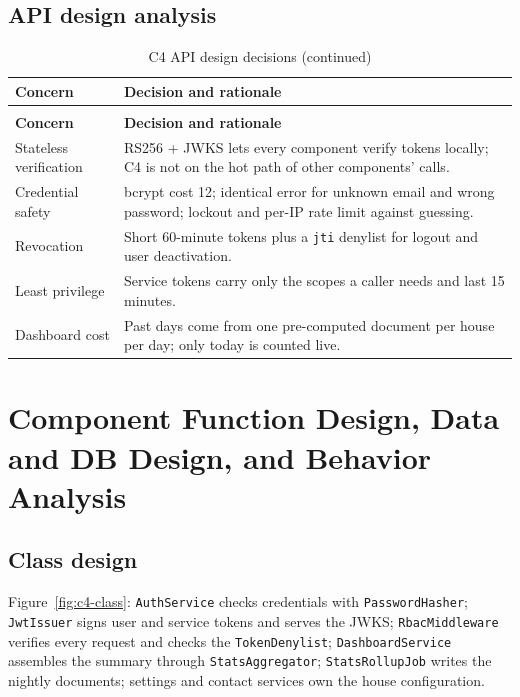 \subsection{API design analysis}
\begin{longtable}{L{2.8cm}L{12.0cm}}
\caption{C4 API design decisions}\\
\toprule
\textbf{Concern} & \textbf{Decision and rationale} \\
\midrule
\endfirsthead
\caption[]{C4 API design decisions (continued)}\\
\toprule
\textbf{Concern} & \textbf{Decision and rationale} \\
\midrule
\endhead
Stateless verification & RS256 + JWKS lets every component verify tokens locally; C4 is not on the hot path of other components' calls. \\
Credential safety & bcrypt cost 12; identical error for unknown email and wrong password; lockout and per-IP rate limit against guessing. \\
Revocation & Short 60-minute tokens plus a \texttt{jti} denylist for logout and user deactivation. \\
Least privilege & Service tokens carry only the scopes a caller needs and last 15 minutes. \\
Dashboard cost & Past days come from one pre-computed document per house per day; only today is counted live. \\
\bottomrule
\end{longtable}

\section{Component Function Design, Data and DB Design, and Behavior Analysis}

\subsection{Class design}
Figure~\ref{fig:c4-class}: \texttt{AuthService} checks credentials with \texttt{PasswordHasher}; \texttt{JwtIssuer}
signs user and service tokens and serves the JWKS; \texttt{RbacMiddleware} verifies every request and checks the
\texttt{TokenDenylist}; \texttt{DashboardService} assembles the summary through \texttt{StatsAggregator};
\texttt{StatsRollupJob} writes the nightly documents; settings and contact services own the house configuration.

